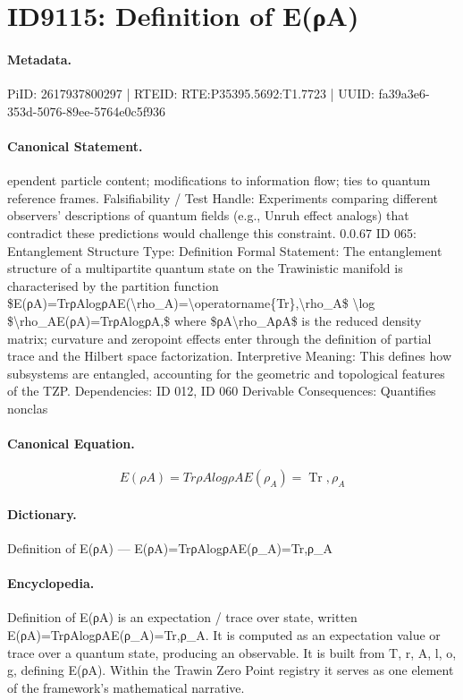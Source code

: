 \section*{ID9115: Definition of E(ρA)}
\paragraph{Metadata.}
PiID: 2617937800297 | RTEID: RTE:P35395.5692:T1.7723 | UUID: fa39a3e6-353d-5076-89ee-5764e0c5f936

\paragraph{Canonical Statement.}
ependent particle content; modifications to information flow; ties to quantum reference frames. Falsifiability / Test Handle: Experiments comparing different observers’ descriptions of quantum fields (e.g., Unruh effect analogs) that contradict these predictions would challenge this constraint. 0.0.67 ID 065: Entanglement Structure Type: Definition Formal Statement: The entanglement structure of a multipartite quantum state on the Trawinistic manifold is characterised by the partition function \$E(ρA)=TrρAlogρAE(\textbackslash{}rho\_A)=\textbackslash{}operatorname\{Tr\},\textbackslash{}rho\_A\$ \textbackslash{}log \$\textbackslash{}rho\_AE(ρA)=TrρAlogρA,\$ where \$ρA\textbackslash{}rho\_AρA\$ is the reduced density matrix; curvature and zeropoint effects enter through the definition of partial trace and the Hilbert space factorization. Interpretive Meaning: This defines how subsystems are entangled, accounting for the geometric and topological features of the TZP. Dependencies: ID 012, ID 060 Derivable Consequences: Quantifies nonclas

\paragraph{Canonical Equation.}
\[
E(ρA)=TrρAlogρAE(\rho_A)=\operatorname{Tr},\rho_A
\]

\paragraph{Dictionary.}
Definition of E(ρA) — E(ρA)=TrρAlogρAE(ρ\_A)=Tr,ρ\_A

\paragraph{Encyclopedia.}
Definition of E(ρA) is an expectation / trace over state, written E(ρA)=TrρAlogρAE(ρ\_A)=Tr,ρ\_A. It is computed as an expectation value or trace over a quantum state, producing an observable. It is built from T, r, A, l, o, g, defining E(ρA). Within the Trawin Zero Point registry it serves as one element of the framework's mathematical narrative.
